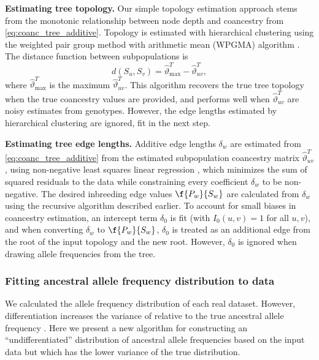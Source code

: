 \documentclass[11pt]{article}
\begin{document}
\textbf{Estimating tree topology.}
Our simple topology estimation approach stems from the monotonic relationship between node depth and coancestry from \cref{eq:coanc_tree_additive}.
Topology is estimated with hierarchical clustering using the weighted pair group method with arithmetic mean (WPGMA) algorithm \citep{sokal_statistical_1958}.
The distance function between subpopulations is
$$
d( S_u, S_v ) = \hat{\vartheta}_\text{max}^T - \hat{\vartheta}_{uv}^T,
$$
where $\hat{\vartheta}_\text{max}^T$ is the maximum $\hat{\vartheta}_{uv}^T$.
This algorithm recovers the true tree topology when the true coancestry values are provided, and performs well when $\hat{\vartheta}_{uv}^T$ are noisy estimates from genotypes.
However, the edge lengths estimated by hierarchical clustering are ignored, fit in the next step.

\textbf{Estimating tree edge lengths.}
Additive edge lengths $\delta_w$ are estimated from \cref{eq:coanc_tree_additive} from the estimated subpopulation coancestry matrix $\hat{\vartheta}_{uv}^T$, using non-negative least squares linear regression \citep{lawson_solving_1974}, which minimizes the sum of squared residuals to the data while constraining every coefficient $\delta_w$ to be non-negative.
The desired inbreeding edge values $\f{P_w}{S_w}$ are calculated from $\delta_w$ using the recursive algorithm described earlier.
To account for small biases in coancestry estimation, an intercept term $\delta_0$ is fit (with $I_0(u,v) = 1$ for all $u,v$), and when converting $\delta_w$ to $\f{P_w}{S_w}$, $\delta_0$ is treated as an additional edge from the root of the input topology and the new root.
However, $\delta_0$ is ignored when drawing allele frequencies from the tree.

\subsubsection{Fitting ancestral allele frequency distribution to data}

We calculated the allele frequency distribution \pith of each real dataset.
However, differentiation increases the variance of \pith relative to the true ancestral allele frequency \pit \citep{ochoa_estimating_2021}.
Here we present a new algorithm for constructing an ``undifferentiated'' distribution of ancestral allele frequencies based on the input data \pith but which has the lower variance of the true \pit distribution.
\end{document}
